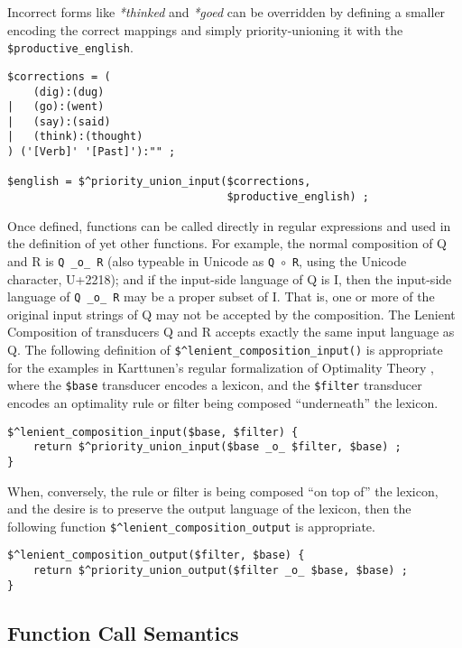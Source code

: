 \noindent
Incorrect forms like \emph{*thinked} and \emph{*goed} can be overridden by 
defining a
smaller \fsm{} encoding the correct mappings and simply priority-unioning it with
the \fsm{} \verb!$productive_english!.

\begin{Verbatim}
$corrections = (
    (dig):(dug)
|   (go):(went)
|   (say):(said)
|   (think):(thought)
) ('[Verb]' '[Past]'):"" ;

$english = $^priority_union_input($corrections, 
                                  $productive_english) ;
\end{Verbatim}


Once defined, functions can be called directly in regular
expressions and used in the definition of yet other functions.  For
example, the normal composition of Q and R 
is \verb!Q _o_ R! (also typeable in Unicode as \verb!Q!~$\circ$~\verb!R!, using the
Unicode  character, U+2218); and if the input-side language of Q is I, then
the input-side language of \verb!Q _o_ R! may be a proper subset of I.
That is, one or more of the original input strings of Q may not be accepted by the 
composition.  The Lenient Composition of transducers Q and R accepts exactly the 
same input language as Q.  The
following definition of \verb!$^lenient_composition_input()! is
appropriate for the examples in Karttunen's regular formalization of Optimality Theory
\citep{karttunen:1998}, where the \verb!$base!
transducer encodes a lexicon, and the \verb!$filter! transducer
encodes an optimality rule or filter being composed
``underneath''
the lexicon.

\begin{Verbatim}
$^lenient_composition_input($base, $filter) {
    return $^priority_union_input($base _o_ $filter, $base) ;
}
\end{Verbatim}

\noindent
When, conversely, the rule or filter is being
composed ``on top of'' the lexicon, and the desire is to
preserve the output language of the lexicon, then the following
function \verb!$^lenient_composition_output! is appropriate.

\begin{Verbatim}
$^lenient_composition_output($filter, $base) {
    return $^priority_union_output($filter _o_ $base, $base) ;
}
\end{Verbatim}



\subsection{Function Call Semantics}

